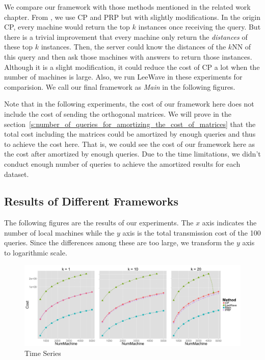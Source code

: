We compare our framework with those methods mentioned in the related work chapter.  From \cite{PRP}, we use CP and PRP but with slightly modifications. In the origin CP, every machine would return the top $k$ instances once receiving the query.  But there is a trivial improvement that every machine only return the \emph{distances} of these top $k$ instances.  Then, the server could know the distances of the $k$NN of this query and then ask those machines with answers to return those instances.  Although it is a slight modification, it could reduce the cost of CP a lot when the number of machines is large.  Also, we run LeeWave \cite{LeeWave} in these experiments for comparision.  We call our final framework as \emph{Main} in the following figures.


Note that in the following experiments, the cost of our framework here does not include the cost of sending the orthogonal matrices.  We will prove in the section~\ref{s:number_of_queries_for_amortizing_the_cost_of_matrices} that the total cost including the matrices could be amortized by enough queries and thus to achieve the cost here.  That is, we could see the cost of our framework here as the cost after amortized by enough queries.  Due to the time limitations, we didn't conduct enough number of queries to achieve the amortized results for each dataset.



\subsection{Results of Different Frameworks} %
\label{sub:results_of_different_fra}

The following figures are the results of our experiments.  The $x$ axis indicates the number of local machines while the $y$ axis is the total transmission cost of the 100 queries.  Since the differences among these are too large, we transform the $y$ axis to logarithmic scale.  

\begin{figure}[htpb!]
  \centering
  \includegraphics[width=1.0\linewidth]{exp/out/time.png}
  \caption{Time Series}
  \label{fig:out_time}
\end{figure}

